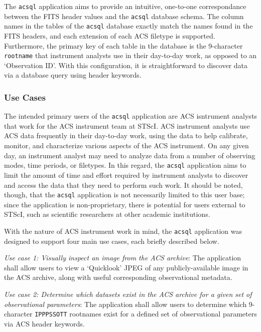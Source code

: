 \documentclass[10pt,journal,compsoc]{IEEEtran}
\begin{document}
The \texttt{acsql} application aims to provide an intuitive, one-to-one correspondance between the FITS header values and the \texttt{acsql} database schema.  The column names in the
tables of the \texttt{acsql} database exactly match the names found in the FITS headers, and each extension of each ACS filetype is supported.  Furthermore, the primary key of each
table in the database is the 9-character \texttt{rootname} that instrument analysts use in their day-to-day work, as opposed to an `Observation ID'.  With this configuration, it
is straightforward to discover data via a database query using header keywords.


\subsubsection{Use Cases} \label{sec1.3.5}

The intended primary users of the \texttt{acsql} application are ACS isntrument analysts that work for the ACS instrument team at STScI.  ACS instrument analysts use ACS data frequently
in their day-to-day work, using the data to help calibrate, monitor, and characterize various aspects of the ACS instrument.  On any given day, an instrument analyst may need to analyze
data from a number of observing modes, time periods, or filetypes.  In this regard, the \texttt{acsql} application aims to limit the amount of time and effort required by instrument
analysts to discover and access the data that they need to perform such work. It should be noted, though, that the \texttt{acsql} application is not necessarily limited to this user base;
since the application is non-proprietary, there is potential for users external to STScI, such as scientific researchers at other academic institutions.

With the nature of ACS instrument work in mind, the \texttt{acsql} application was designed to support four main use cases, each briefly described below.

\textit{Use case 1: Visually inspect an image from the ACS archive}:  The application shall allow users to view a `Quicklook' JPEG of any publicly-available image in the ACS archive,
along with useful corresponding observational metadata.

\textit{Use case 2: Determine which datasets exist in the ACS archive for a given set of observational parameters}:  The application shall allow users to determine which
9-character \texttt{IPPPSSOTT} rootnames exist for a defined set of observational parameters via ACS header keywords.
\end{document}
